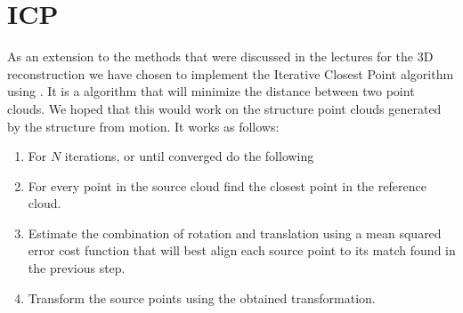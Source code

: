 \section{ICP}
\label{ICP}
As an extension to the methods that were discussed in the lectures for the 3D reconstruction we have chosen to implement the Iterative Closest Point algorithm using . It is a algorithm that will minimize the distance between two point clouds. We hoped that this would work on the structure point clouds generated by the structure from motion. It works as follows:
\begin{enumerate}
	\item For $N$ iterations, or until converged do the following
	\item For every point in the source cloud find the closest point in the reference cloud.
	\item Estimate the combination of rotation and translation using a mean squared error cost function that will best align each source point to its match found in the previous step.
	\item Transform the source points using the obtained transformation.
\end{enumerate}

